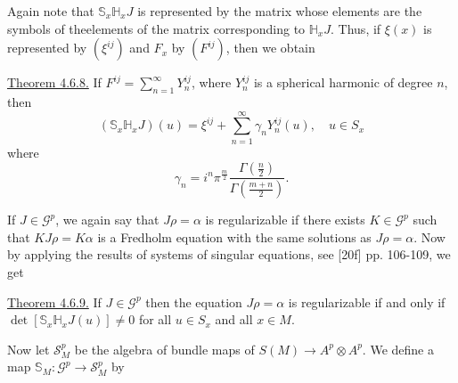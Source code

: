 Again note that $\mathbb S_x\mathbb H_xJ$ is represented by the matrix whose elements are the symbols of theelements of the matrix corresponding to $\mathbb H_xJ$. Thus, if $\xi(x)$ is represented by $(\xi^{ij})$ and $F_x$ by $(F^{ij})$, then we obtain

\uline{Theorem 4.6.8.} If $F^{ij}=\displaystyle\sum_{n=1}^{\infty}Y_n^{ij}$, where $Y_n^{ij}$ is a spherical harmonic of degree $n$, then
\[
(\mathbb S_x\mathbb H_xJ)(u)=\xi^{ij}+\sum_{n=1}^{\infty}\gamma_nY_n^{ij}(u),
\quad u\in S_x
\]
where
\[
\gamma_n=i^n\pi^{\frac m2}\frac{\Gamma(\frac n2)}{\Gamma(\frac{m+n}{2})}.
\]

If $J\in\mathcal G^p$, we again say that $J\rho=\alpha$ is regularizable if there exists $K\in\mathcal G^p$ such that $KJ\rho=K\alpha$ is a Fredholm equation with the same solutions as $J\rho=\alpha$. Now by applying the results of systems of singular equations, see [20f] pp. 106-109, we get

\uline{Theorem 4.6.9.} If $J\in\mathcal G^p$ then the equation $J\rho=\alpha$ is regularizable if and only if
$\det[\mathbb S_x\mathbb H_xJ(u)]\ne0$ for all $u\in S_x$ and all $x\in M$.

Now let $\mathcal S_M^p$ be the algebra of bundle maps of $S(M)\longrightarrow A^p\otimes A^p$. We define a map
$\mathbb S_M:\mathcal G^p\longrightarrow\mathcal S_M^p$ by

